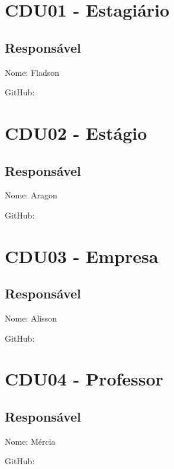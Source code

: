 \documentclass[12pt]{report}
\begin{document}
\section{CDU01 - Estagiário}

\subsection{Responsável}

Nome: Fladson

GitHub:



\section{CDU02 - Estágio}

\subsection{Responsável}

Nome: Aragon

GitHub:



\section{CDU03 - Empresa}

\subsection{Responsável}

Nome: Alisson

GitHub:



\section{CDU04 - Professor}

\subsection{Responsável}

Nome: Mércia

GitHub:


\end{document}
